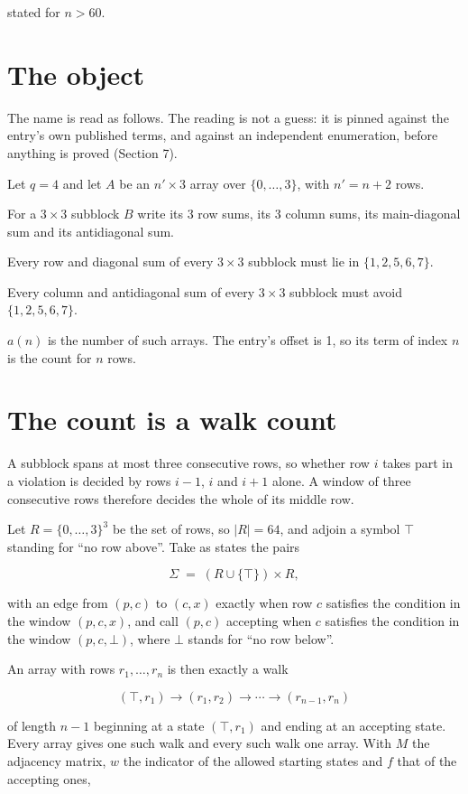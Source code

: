 \documentclass[11pt]{article}
\theoremstyle{definition}
\begin{document}
stated for $n > 60$.

\section{The object}

The name is read as follows. The reading is not a guess: it is pinned against the entry's own published terms, and against an independent enumeration, before anything is proved (Section 7).

Let $q = 4$ and let $A$ be an $n' \times 3$ array over $\{0,\dots,3\}$, with $n' = n + 2$ rows.

For a $3\times3$ subblock $B$ write its 3 row sums, its 3 column sums, its main-diagonal sum and its antidiagonal sum.

Every row and diagonal sum of every $3\times3$ subblock must lie in $\{1, 2, 5, 6, 7\}$.

Every column and antidiagonal sum of every $3\times3$ subblock must avoid $\{1, 2, 5, 6, 7\}$.

$a(n)$ is the number of such arrays. The entry's offset is 1, so its term of index $n$ is the count for $n$ rows.

\section{The count is a walk count}

A subblock spans at most three consecutive rows, so whether row $i$ takes part in a violation is decided by rows $i-1$, $i$ and $i+1$ alone. A window of three consecutive rows therefore decides the whole of its middle row.

Let $R = \{0,\dots,3\}^{3}$ be the set of rows, so $|R| = 64$, and adjoin a symbol $\top$ standing for ``no row above''. Take as states the pairs

\[\Sigma \;=\; (R \cup \{\top\}) \times R,\]

with an edge from $(p,c)$ to $(c,x)$ exactly when row $c$ satisfies the condition in the window $(p,c,x)$, and call $(p,c)$ accepting when $c$ satisfies the condition in the window $(p,c,\bot)$, where $\bot$ stands for ``no row below''.

An array with rows $r_1,\dots,r_n$ is then exactly a walk

\[(\top,r_1) \to (r_1,r_2) \to \cdots \to (r_{n-1},r_n)\]

of length $n-1$ beginning at a state $(\top,r_1)$ and ending at an accepting state. Every array gives one such walk and every such walk one array. With $M$ the adjacency matrix, $w$ the indicator of the allowed starting states and $f$ that of the accepting ones,
\end{document}

